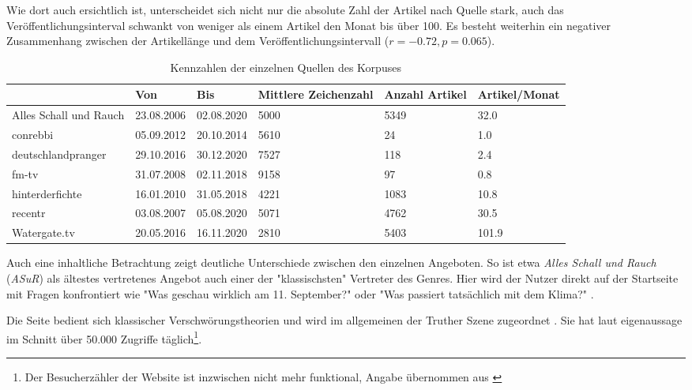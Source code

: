 Wie dort auch ersichtlich ist, unterscheidet sich nicht nur die absolute Zahl der Artikel nach Quelle stark, auch das Veröffentlichungsinterval schwankt von weniger als einem Artikel den Monat bis über 100.
Es besteht weiterhin ein negativer Zusammenhang zwischen der Artikellänge und dem Veröffentlichungsintervall ($r = -0.72, p = 0.065$).

\begin{table}
    \begin{center}
        \begin{tabularx}{\textwidth}{lXXXXX}
            \toprule
            & Von & Bis & Mittlere Zeichenzahl & Anzahl Artikel & Artikel/Monat\\
            \midrule
            Alles Schall und Rauch & 23.08.2006 & 02.08.2020 & 5000 & 5349 & 32.0\\
            conrebbi & 05.09.2012 & 20.10.2014 & 5610 & 24 & 1.0\\
            deutschlandpranger & 29.10.2016 & 30.12.2020 & 7527 & 118 & 2.4\\
            fm-tv & 31.07.2008 & 02.11.2018 & 9158 & 97 & 0.8\\
            hinterderfichte & 16.01.2010 & 31.05.2018 & 4221 & 1083 & 10.8\\
            \addlinespace
            recentr & 03.08.2007 & 05.08.2020 & 5071 & 4762 & 30.5\\
            Watergate.tv & 20.05.2016 & 16.11.2020 & 2810 & 5403 & 101.9\\
            \bottomrule
            \end{tabularx}
        \caption{Kennzahlen der einzelnen Quellen des Korpuses}
        \label{corpus-stats}
    \end{center}
\end{table}

Auch eine inhaltliche Betrachtung zeigt deutliche Unterschiede zwischen den einzelnen Angeboten.
So ist etwa \textit{Alles Schall und Rauch} (\textit{ASuR}) als ältestes vertretenes Angebot auch einer der "klassischsten"  Vertreter des Genres.
Hier wird der Nutzer direkt auf der Startseite mit Fragen konfrontiert wie "Was geschau wirklich am 11. September?" oder "Was passiert tatsächlich mit dem Klima?" \parencite{asur-homepage}. 

Die Seite bedient sich klassischer Verschwörungstheorien und wird im allgemeinen der Truther Szene zugeordnet \parencite{psiram-asur}.
Sie hat laut eigenaussage im Schnitt über 50.000 Zugriffe täglich\footnote{Der Besucherzähler der Website ist inzwischen nicht mehr funktional, Angabe übernommen aus \parencite{vice-asur}}.


